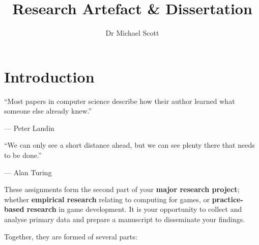 \documentclass{../fal_assignment}
\title{Research Artefact \& Dissertation}
\author{Dr Michael Scott}
\begin{document}
\maketitle

\section*{Introduction}

\begin{marginquote}
``Most papers in computer science describe how their author learned what someone else already knew.''

--- Peter Landin

    \marginquoterule

``We can only see a short distance ahead, but we can see plenty there that needs to be done.''

--- Alan Turing

\end{marginquote}

 These assignments form the second part of your \textbf{major research project}; whether \textbf{empirical research} relating to computing for games, or \textbf{practice-based research} in game development. It is your opportunity to collect and analyse primary data and prepare a manuscript to disseminate your findings.

Together, they are formed of several parts:
\end{document}
